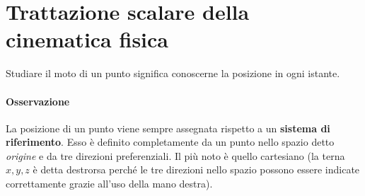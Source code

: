 \documentclass[10pt,a4paper]{book}
\begin{document}
\section{Trattazione scalare della cinematica fisica}

Studiare il moto di un punto significa conoscerne la posizione in ogni istante.

\paragraph{Osservazione} La posizione di un punto viene sempre assegnata rispetto a un \textbf{sistema di riferimento}. Esso è definito completamente da un punto nello spazio detto \emph{origine} e da tre direzioni preferenziali. Il più noto è quello cartesiano (la terna $x, y, z$ è detta destrorsa perché le tre direzioni nello spazio possono essere indicate correttamente grazie all'uso della mano destra).
\end{document}
